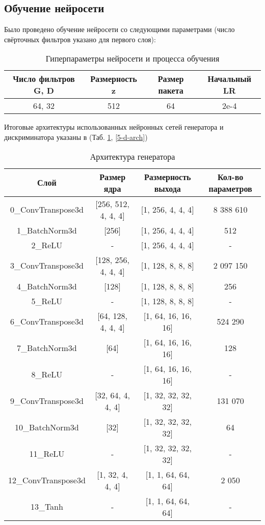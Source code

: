 	\subsection{Обучение нейросети}
		Было проведено обучение нейросети со следующими параметрами (число свёрточных фильтров указано для первого слоя):
		\begin{table}[h]
			\centering
			\begin{tabular}{|c|c|c|c|}
				\hline
				Число фильтров G, D & Размерность z & Размер пакета & Начальный LR \\
				\hline
				64, 32 & 512 & 64 & 2e-4 \\
				\hline
			\end{tabular}
			\caption{Гиперпараметры нейросети и процесса обучения}
		\end{table}
	
		Итоговые архитектуры использованных нейронных сетей генератора и дискриминатора указаны в (Таб. \ref{5-g-arch}, \ref{5-d-arch})
		\begin{table}[h]
			\tabcolsep=0.11cm
			\centering
			\begin{tabular}{|c|c|c|c|}
				\hline
				Слой & Размер ядра & Размерность выхода & Кол-во параметров \\
				\hline
				0\_ConvTranspose3d &  [256, 512, 4, 4, 4] & [1, 256, 4, 4, 4] & 8 388 610 \\
				1\_BatchNorm3d &  [256] & [1, 256, 4, 4, 4] & 512 \\
				2\_ReLU & - & [1, 256, 4, 4, 4] & - \\
				\hline
				3\_ConvTranspose3d &  [128, 256, 4, 4, 4] & [1, 128, 8, 8, 8] & 2 097 150 \\
				4\_BatchNorm3d &  [128] & [1, 128, 8, 8, 8] & 256 \\
				5\_ReLU & - & [1, 128, 8, 8, 8] & - \\
				\hline
				6\_ConvTranspose3d &  [64, 128, 4, 4, 4] & [1, 64, 16, 16, 16] & 524 290 \\
				7\_BatchNorm3d &  [64] & [1, 64, 16, 16, 16] & 128 \\
				8\_ReLU & - & [1, 64, 16, 16, 16] & - \\
				\hline
				9\_ConvTranspose3d &  [32, 64, 4, 4, 4] & [1, 32, 32, 32, 32] & 131 070 \\
				10\_BatchNorm3d &  [32] & [1, 32, 32, 32, 32] & 64 \\
				11\_ReLU & - & [1, 32, 32, 32, 32] & - \\
				\hline
				12\_ConvTranspose3d &  [1, 32, 4, 4, 4] & [1, 1, 64, 64, 64] & 2 050 \\
				13\_Tanh & - & [1, 1, 64, 64, 64] & - \\
				\hline
			\end{tabular}
			\caption{Архитектура генератора}
			\label{5-g-arch}
		\end{table}
	
